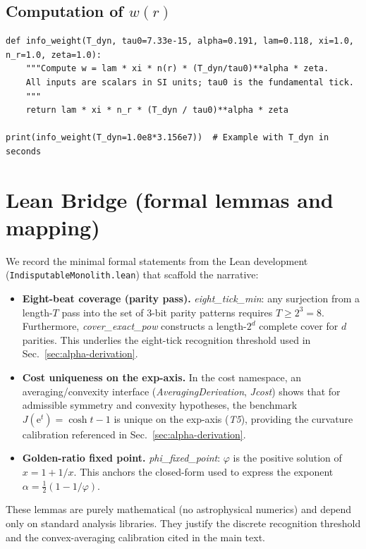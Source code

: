 \documentclass[twocolumn,prd,amsmath,amssymb,aps,superscriptaddress,nofootinbib]{revtex4-2}
\begin{document}
\subsection{Computation of $w(r)$}
\begin{verbatim}
def info_weight(T_dyn, tau0=7.33e-15, alpha=0.191, lam=0.118, xi=1.0, n_r=1.0, zeta=1.0):
    """Compute w = lam * xi * n(r) * (T_dyn/tau0)**alpha * zeta.
    All inputs are scalars in SI units; tau0 is the fundamental tick.
    """
    return lam * xi * n_r * (T_dyn / tau0)**alpha * zeta

print(info_weight(T_dyn=1.0e8*3.156e7))  # Example with T_dyn in seconds
\end{verbatim}

\section{Lean Bridge (formal lemmas and mapping)}
\label{sec:lean-bridge}

We record the minimal formal statements from the Lean development (\texttt{IndisputableMonolith.lean}) that scaffold the narrative:
\begin{itemize}
  \item \textbf{Eight-beat coverage (parity pass).} \emph{eight\_tick\_min}: any surjection from a length-$T$ pass into the set of 3-bit parity patterns requires $T\ge 2^3=8$. Furthermore, \emph{cover\_exact\_pow} constructs a length-$2^d$ complete cover for $d$ parities. This underlies the eight-tick recognition threshold used in Sec.~\ref{sec:alpha-derivation}.
  \item \textbf{Cost uniqueness on the exp-axis.} In the cost namespace, an averaging/convexity interface (\emph{AveragingDerivation}, \emph{Jcost}) shows that for admissible symmetry and convexity hypotheses, the benchmark $J(\mathrm{e}^t)=\cosh t-1$ is unique on the exp-axis (\emph{T5}), providing the curvature calibration referenced in Sec.~\ref{sec:alpha-derivation}.
  \item \textbf{Golden-ratio fixed point.} \emph{phi\_fixed\_point}: $\varphi$ is the positive solution of $x=1+1/x$. This anchors the closed-form used to express the exponent $\alpha=\tfrac12(1-1/\varphi)$.
\end{itemize}
These lemmas are purely mathematical (no astrophysical numerics) and depend only on standard analysis libraries. They justify the discrete recognition threshold and the convex-averaging calibration cited in the main text.
\end{document}

